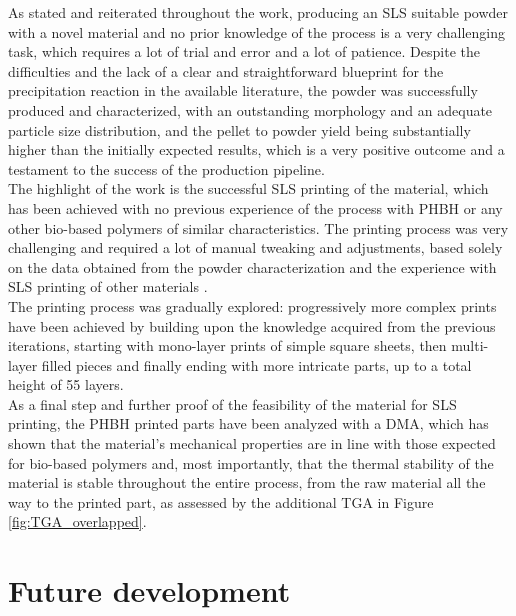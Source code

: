 \documentclass[a4paper]{article}
\begin{document}
    As stated and reiterated throughout the work, producing an SLS suitable powder with a novel material and no prior knowledge of the process is a 
    very challenging task, which requires a lot of trial and error and a lot of patience. Despite the difficulties and the lack of a clear and 
    straightforward blueprint for the precipitation reaction in the available literature, the powder was successfully produced and characterized, 
    with an outstanding morphology and an adequate particle size distribution, and the pellet to powder yield being
    substantially higher than the initially expected results, which is a very positive outcome and a testament to the success of the 
    production pipeline. \\ 

    The highlight of the work is the successful SLS printing of the material, which has been achieved with no previous 
    experience of the process with PHBH or any other bio-based polymers of similar characteristics. 
    The printing process was very challenging and required a lot of manual tweaking and adjustments, based solely on the data 
    obtained from the powder characterization and the experience with SLS printing of other materials \autocites{Powder_characteristics_PBF_effects}. \\ 

    The printing process was gradually explored: progressively more complex prints have been achieved by building upon the knowledge 
    acquired from the previous iterations, starting with mono-layer prints of simple square 
    sheets, then multi-layer filled pieces and finally ending with more intricate parts, up to a total height of 55 layers. \\ 

    As a final step and further proof of the feasibility of the material for SLS printing, the PHBH printed parts have been 
    analyzed with a DMA, which has shown that the material's mechanical properties are in line with those expected for bio-based polymers 
    and, most importantly, that the thermal stability of the material is stable throughout the entire process, from the raw material all the way to the 
    printed part, as assessed by the additional TGA in Figure \ref{fig:TGA_overlapped}. \\ 

    

    \clearpage
    \section{Future development\label{Future_development_and_research}}
\end{document}
